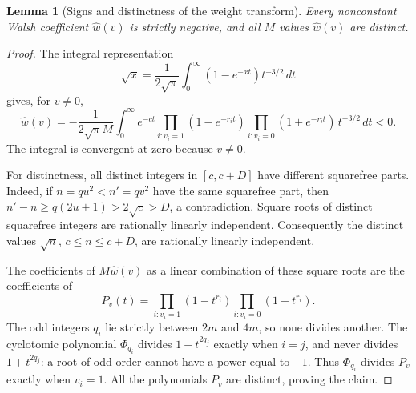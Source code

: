 \documentclass[11pt]{article}
\newtheorem{lemma}[theorem]{Lemma}
\begin{document}
\begin{lemma}[Signs and distinctness of the weight transform]\label{lem:weights}
Every nonconstant Walsh coefficient $\widehat w(v)$ is strictly
negative, and all $M$ values $\widehat w(v)$ are distinct.
\end{lemma}
\begin{proof}
The integral representation
\[
 \sqrt x=\frac1{2\sqrt\pi}\int_0^\infty(1-e^{-xt})t^{-3/2}\,dt
\]
gives, for $v\ne0$,
\[
 \widehat w(v)=-\frac1{2\sqrt\pi M}
 \int_0^\infty e^{-ct}
 \prod_{i:v_i=1}(1-e^{-r_i t})
 \prod_{i:v_i=0}(1+e^{-r_i t})\,t^{-3/2}\,dt<0.
\]
The integral is convergent at zero because $v\ne0$.

For distinctness, all distinct integers in $[c,c+D]$ have different
squarefree parts. Indeed, if $n=qu^2<n'=qv^2$ have the same squarefree
part, then
$n'-n\ge q(2u+1)>2\sqrt c>D$, a contradiction. Square roots of
distinct squarefree integers are rationally linearly independent.
Consequently the distinct values $\sqrt n$, $c\le n\le c+D$, are
rationally linearly independent.

The coefficients of $M\widehat w(v)$ as a linear combination of these
square roots are the coefficients of
\[
 P_v(t)=\prod_{i:v_i=1}(1-t^{r_i})
         \prod_{i:v_i=0}(1+t^{r_i}).
\]
The odd integers $q_i$ lie strictly between $2m$ and $4m$, so none
divides another. The cyclotomic polynomial $\Phi_{q_i}$ divides
$1-t^{2q_j}$ exactly when $i=j$, and never divides
$1+t^{2q_j}$: a root of odd order cannot have a power equal to $-1$.
Thus $\Phi_{q_i}$ divides $P_v$ exactly when $v_i=1$. All the
polynomials $P_v$ are distinct, proving the claim.
\end{proof}
\end{document}
